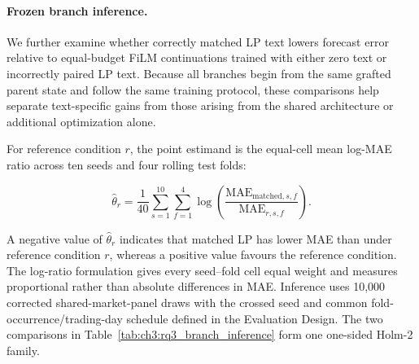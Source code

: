 \paragraph*{Frozen branch inference.}

We further examine whether correctly matched LP text lowers forecast error
relative to equal-budget FiLM continuations trained with either zero text or
incorrectly paired LP text.  Because all branches begin from the same grafted
parent state and follow the same training protocol, these comparisons help
separate text-specific gains from those arising from the shared architecture
or additional optimization alone.

For reference condition $r$, the point estimand is the equal-cell mean
log-MAE ratio across ten seeds and four rolling test folds:

\begin{equation}
\widehat{\theta}_{r}
=
\frac{1}{40}
\sum_{s=1}^{10}
\sum_{f=1}^{4}
\log\left(
\frac{\mathrm{MAE}_{\mathrm{matched},s,f}}
     {\mathrm{MAE}_{r,s,f}}
\right).
\end{equation}

A negative value of $\widehat{\theta}_{r}$ indicates that matched LP has lower
MAE than under reference condition $r$, whereas a positive value favours the
reference condition.  The log-ratio formulation gives every seed--fold cell
equal weight and measures proportional rather than absolute differences in
MAE.  Inference uses 10,000 corrected shared-market-panel draws with the
crossed seed and common fold-occurrence/trading-day schedule defined in the
Evaluation Design.  The two comparisons in
Table~\ref{tab:ch3:rq3_branch_inference} form one one-sided Holm-2 family.

